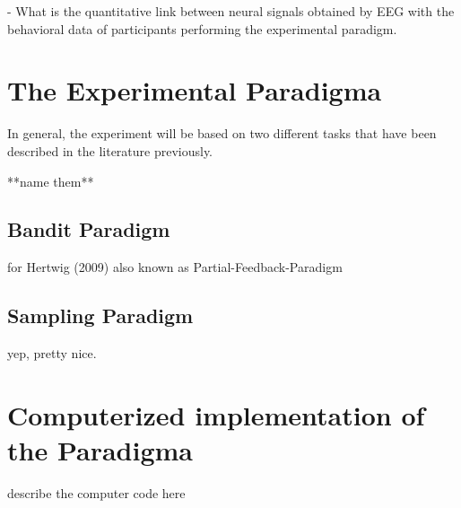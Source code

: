 \documentclass[12pt, oneside]{scrartcl}
\begin{document}
- What is the quantitative link between neural signals obtained by EEG with the behavioral data of participants performing the experimental paradigm. 

\section{The Experimental Paradigma}

In general, the experiment will be based on two different tasks that have been described in the literature previously. 

**name them**

\subsection{Bandit Paradigm}

for Hertwig (2009) also known as Partial-Feedback-Paradigm

\subsection{Sampling Paradigm}

yep, pretty nice.


\section{Computerized implementation of the Paradigma}

describe the computer code here
\end{document}
